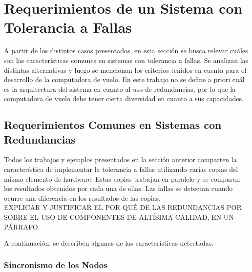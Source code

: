 \section{Requerimientos de un Sistema con Tolerancia a Fallas}\label{sec:requerimentos_sistema_tolerancia_fallas}

A partir de los distintos casos presentados, en esta sección se busca relevar cuáles son las características comunes en sistemas con tolerancia a fallas. Se analizan las distintas alternativas y luego se mencionan los criterios tenidos en cuenta para el desarrollo de la computadora de vuelo. En este trabajo no se define a priori cuál es la arquitectura del sistema en cuanto al uso de redundancias, por lo que la computadora de vuelo debe tener cierta diversidad en cuanto a sus capacidades.\\

\subsection{Requerimientos Comunes en Sistemas con Redundancias}

Todos los trabajos y ejemplos presentados en la sección anterior comparten la característica de implementar la tolerancia a fallas utilizando varias copias del mismo elemento de hardware. Estas copias trabajan en paralelo y se comparan los resultados obtenidos por cada una de ellas. Las fallas se detectan cuando ocurre una diferencia en los resultados de las copias.\\

{\color{red} EXPLICAR Y JUSTIFICAR EL POR QUÉ DE LAS REDUNDANCIAS POR SOBRE EL USO DE COMPONENTES DE ALTÍSIMA CALIDAD, EN UN PÁRRAFO.}

A continuación, se describen algunas de las características detectadas.

\subsubsection{Sincronismo de los Nodos}

